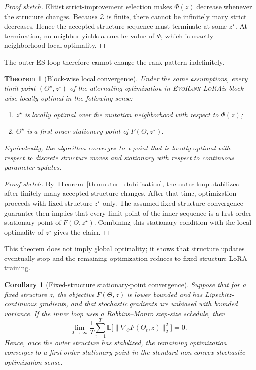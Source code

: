 \documentclass{article}
\newtheorem{theorem}{Theorem}
\newtheorem{corollary}{Corollary}
\newcommand{\method}{\textsc{EvoRank-LoRA}}
\begin{document}
\begin{proof}[Proof sketch]
Elitist strict-improvement selection makes $\Phi(z)$ decrease whenever the structure changes. Because $\mathcal{Z}$ is finite, there cannot be infinitely many strict decreases. Hence the accepted structure sequence must terminate at some $z^\star$. At termination, no neighbor yields a smaller value of $\Phi$, which is exactly neighborhood local optimality.
\end{proof}

The outer ES loop therefore cannot change the rank pattern indefinitely.

\begin{theorem}[Block-wise local convergence]
\label{thm:block_convergence}
Under the same assumptions, every limit point $(\Theta^\star, z^\star)$ of the alternating optimization in \method is block-wise locally optimal in the following sense:
\begin{enumerate}[leftmargin=1.2em]
    \item $z^\star$ is locally optimal over the mutation neighborhood with respect to $\Phi(z)$;
    \item $\Theta^\star$ is a first-order stationary point of $F(\Theta, z^\star)$.
\end{enumerate}
Equivalently, the algorithm converges to a point that is locally optimal with respect to discrete structure moves and stationary with respect to continuous parameter updates.
\end{theorem}

\begin{proof}[Proof sketch]
By Theorem~\ref{thm:outer_stabilization}, the outer loop stabilizes after finitely many accepted structure changes. After that time, optimization proceeds with fixed structure $z^\star$ only. The assumed fixed-structure convergence guarantee then implies that every limit point of the inner sequence is a first-order stationary point of $F(\Theta, z^\star)$. Combining this stationary condition with the local optimality of $z^\star$ gives the claim.
\end{proof}

This theorem does not imply global optimality; it shows that structure updates eventually stop and the remaining optimization reduces to fixed-structure LoRA training.

\begin{corollary}[Fixed-structure stationary-point convergence]
\label{cor:fixed_structure_sgd}
Suppose that for a fixed structure $z$, the objective $F(\Theta, z)$ is lower bounded and has Lipschitz-continuous gradients, and that stochastic gradients are unbiased with bounded variance. If the inner loop uses a Robbins--Monro step-size schedule, then
\begin{equation}
    \lim_{T \to \infty} \frac{1}{T} \sum_{t=1}^{T} \mathbb{E}\bigl[\|\nabla_{\Theta} F(\Theta_t, z)\|_2^2\bigr] = 0.
\end{equation}
Hence, once the outer structure has stabilized, the remaining optimization converges to a first-order stationary point in the standard non-convex stochastic optimization sense.
\end{corollary}
\end{document}
